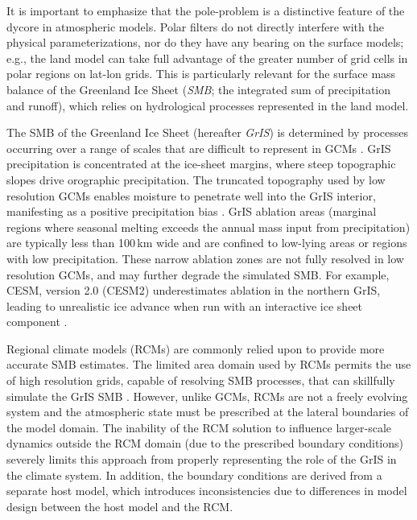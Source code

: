 \documentclass[draft]{agujournal2019}
\begin{document}
It is important to emphasize that the pole-problem is a distinctive feature of the dycore in atmospheric models. Polar filters do not directly interfere with the physical parameterizations, nor do they have any bearing on the surface models; e.g., the land model can take full advantage of the greater number of grid cells in polar regions on lat-lon grids. This is particularly relevant for the surface mass balance of the Greenland Ice Sheet (\textit{SMB}; the integrated sum of precipitation and runoff), which relies on hydrological processes represented in the land model.

The SMB of the Greenland Ice Sheet (hereafter \textit{GrIS}) is determined by processes occurring over a range of scales that are difficult to represent in GCMs \cite{P2010CC}. GrIS precipitation is concentrated at the ice-sheet margins, where steep topographic slopes drive orographic precipitation. The truncated topography used by low resolution GCMs enables moisture to penetrate well into the GrIS interior, manifesting as a positive precipitation bias \cite{P2000GPC,VETAL2018TC}. GrIS ablation areas (marginal regions where seasonal melting exceeds the annual mass input from precipitation) are typically less than 100\,km wide and are confined to low-lying areas or regions with low precipitation. These narrow ablation zones are not fully resolved in low resolution GCMs, and may further degrade the simulated SMB. For example, CESM, version 2.0 (CESM2) underestimates ablation in the northern GrIS, leading to unrealistic ice advance when run with an interactive ice sheet component \cite{LETAL2020JAMES}.

Regional climate models (RCMs) are commonly relied upon to provide more accurate SMB estimates. The limited area domain used by RCMs permits the use of high resolution grids, capable of resolving SMB processes, that can skillfully simulate the GrIS SMB \cite{BETAL2004JGR,RETAL2012TC,VETAL2012TC,FETAL2013TC,METAL2017LTS,NETAL2018TC}. However, unlike GCMs, RCMs are not a freely evolving system and the atmospheric state must be prescribed at the lateral boundaries of the model domain. The inability of the RCM solution to influence larger-scale dynamics outside the RCM domain (due to the prescribed boundary conditions) severely limits this approach from properly representing the role of the GrIS in the climate system. In addition, the boundary conditions are derived from a separate host model, which introduces inconsistencies due to differences in model design between the host model and the RCM.
\end{document}
